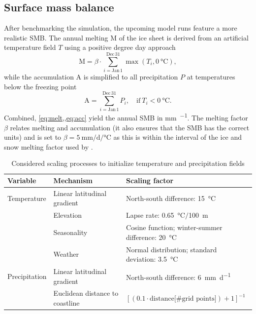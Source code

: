 \subsection{Surface mass balance}\label{sec:smb}

After benchmarking the simulation, the upcoming model runs feature a more realistic SMB. The annual melting \(\mathrm{M}\) of the ice sheet is derived from an artificial temperature field \(T\) using a positive degree day approach
\begin{equation}\label{eq:melt}
	\mathrm{M} = \beta \cdot \sum_{i=\mathrm{Jan\, 1}}^{\mathrm{Dec\, 31}} \max \left(T_{i},\SI{0}{\celsius}\right),
\end{equation}
while the accumulation \(\mathrm{A}\) is simplified to all precipitation \(P\) at temperatures below the freezing point 
\begin{equation}\label{eq:acc}
	\text{A} = \sum_{i=\mathrm{Jan\, 1}}^{\mathrm{Dec\, 31}}P_{i},\quad \text{if}\ T_i < \SI{0}{\celsius}.
\end{equation}
Combined, \cref{eq:melt,,eq:acc} yield the annual SMB in \si{\mm\per\year}. The melting factor \(\beta\) relates melting and accumulation (it also ensures that the SMB has the correct units) and is set to \(\beta = \SI{5}{\mm\per\day\per\celsius}\) as this is within the interval of the ice and snow melting factor used by \textcite{seguinot2013}. 

\begin{table}
	\centering
	\begin{tabularx}{\textwidth}{llX}
		\toprule
		Variable & Mechanism & Scaling factor \\
		\midrule
		Temperature & Linear latitudinal gradient & North-south difference: \SI{15}{\celsius} \\
		 & Elevation & Lapse rate: \SI{0.65}{\celsius}\(/\)\SI{100}{\m} \\
		 & Seasonality & Cosine function; winter-summer difference: \SI{20}{\celsius} \\
		 & Weather & Normal distribution; standard deviation: \SI{3.5}{\celsius} \\
		\midrule
		Precipitation & Linear latitudinal gradient & North-south difference: \SI{6}{\mm\per\day} \\
		 & Euclidean distance to coastline & \(\left[\left(0.1 \cdot \text{distance[\# grid points]}\right)+1\right]^{-1}\) \\
		\bottomrule
	\end{tabularx}
	\caption{Considered scaling processes to initialize temperature and precipitation fields}
	\label{tab:smb}
\end{table}

